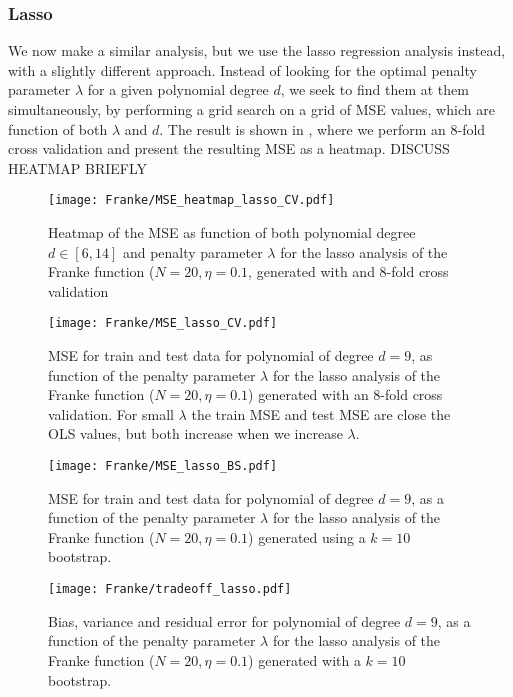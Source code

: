         \subsubsection{Lasso}\label{sec:lassoanalysis}

        We now make a similar analysis, but we use the lasso regression analysis instead, with a slightly different approach. Instead of looking for the optimal penalty parameter $\lambda$ for a given polynomial degree $d$, we seek to find them at them simultaneously, by performing a grid search on a grid of MSE values, which are function of both $\lambda$ and $d$. The result is shown in , where we perform an 8-fold cross validation and present the resulting MSE as a heatmap. 
        DISCUSS HEATMAP BRIEFLY

        \begin{figure}
            \texttt{[image: Franke/MSE\_heatmap\_lasso\_CV.pdf]}
            \caption{Heatmap of the MSE as function of both polynomial degree $d\in[6,14]$ and penalty parameter $\lambda$ for the lasso analysis of the Franke function ($N=20, \eta=0.1$, generated with and 8-fold cross validation}
            \label{fig:gridsearch_cv_lasso}
        \end{figure}


        \begin{figure} 
            \texttt{[image: Franke/MSE\_lasso\_CV.pdf]}
            \caption{MSE for train and test data for polynomial of degree $d=9$, as function of the penalty parameter $\lambda$ for the lasso analysis of the Franke function ($N=20, \eta=0.1$) generated with an 8-fold cross validation. For small $\lambda$ the train MSE and test MSE are close the OLS values, but both increase when we increase $\lambda$.}
            \label{fig:cross-validation_lasso}
        \end{figure}


        \begin{figure}
            \texttt{[image: Franke/MSE\_lasso\_BS.pdf]}
            \caption{MSE for train and test data for polynomial of degree $d=9$, as a function of the penalty parameter $\lambda$ for the lasso analysis of the Franke function ($N=20, \eta=0.1$) generated using a $k=10$ bootstrap. }
            \label{fig:bootstrapping_lasso}
        \end{figure}

        \begin{figure}
            \texttt{[image: Franke/tradeoff\_lasso.pdf]}
            \caption{Bias, variance and residual error for polynomial of degree $d=9$, as a function of the penalty parameter $\lambda$ for the lasso analysis of the Franke function ($N=20, \eta=0.1$) generated with a $k=10$ bootstrap.}
            \label{fig:bias_variance_lasso}
        \end{figure} 


